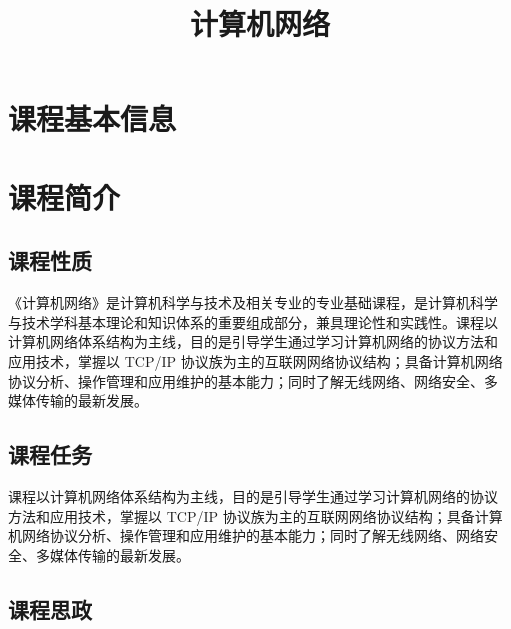 \documentclass{swfusyllabus}
\title{计算机网络}
\begin{document}
\maketitle{}

\section{课程基本信息}

\basicinfo{}

\section{课程简介}

\subsection{课程性质}

《计算机网络》是计算机科学与技术及相关专业的专业基础课程，是计算机科学
与技术学科基本理论和知识体系的重要组成部分，兼具理论性和实践性。课程以
计算机网络体系结构为主线，目的是引导学生通过学习计算机网络的协议方法和
应用技术，掌握以 TCP/IP 协议族为主的互联网网络协议结构；具备计算机网络
协议分析、操作管理和应用维护的基本能力；同时了解无线网络、网络安全、多
媒体传输的最新发展。

\subsection{课程任务}




课程以计算机网络体系结构为主线，目的是引导学生通过学习计算机网络的协议
方法和应用技术，掌握以 TCP/IP 协议族为主的互联网网络协议结构；具备计算
机网络协议分析、操作管理和应用维护的基本能力；同时了解无线网络、网络安
全、多媒体传输的最新发展。

\subsection{课程思政}
\end{document}
